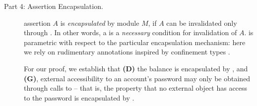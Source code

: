 \begin{description}
\item[Part 4: Assertion Encapsulation.]  
 assertion $A$  is
\emph{encapsulated} by  module $M$, if  $A$ can be invalidated only through
 .
  In other words, a    is a \emph{necessary} condition for
invalidation of $A$.
  is parametric with respect to the 
particular encapsulation
mechanism: here we rely on rudimentary annotations inspired by confinement types
\cite{confined}.

\vertsp

For our proof, we establish that  \textbf{(D)} the balance is encapsulated 
by , and  \textbf{(G)},   external accessibility to an account's password may 
only be obtained through   calls to  -- that is,  the property that
no external object has access to the password is encapsulated by .
 
\end{description} 




